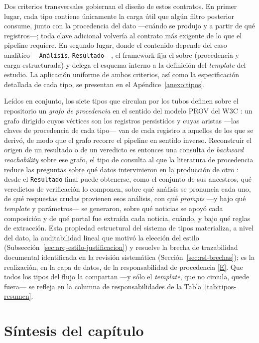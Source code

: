 \documentclass[12pt]{report}
\DeclareRobustCommand{\resp}[1]{\hyperref[tab:registro-responsabilidades]{\textcolor{respcolor}{[#1]}}}
\begin{document}
Dos criterios transversales gobiernan el diseño de estos contratos. En primer lugar, cada tipo contiene únicamente la carga útil que algún filtro posterior consume, junto con la procedencia del dato ---cuándo se produjo y a partir de qué registros---; toda clave adicional volvería al contrato más exigente de lo que el pipeline requiere. En segundo lugar, donde el contenido depende del caso analítico ---\texttt{Análisis}, \texttt{Resultado}---, el framework fija el sobre (procedencia y carga estructurada) y delega el esquema interno a la definición del \textit{template} del estudio. La aplicación uniforme de ambos criterios, así como la especificación detallada de cada tipo, se presentan en el Apéndice~\ref{anexo:tipos}.

Leídos en conjunto, los siete tipos que circulan por los tubos definen sobre el repositorio un \textit{grafo de procedencia} en el sentido del modelo PROV del W3C \citep{provdm:2013}: un grafo dirigido cuyos vértices son los registros persistidos y cuyas aristas ---las claves de procedencia de cada tipo--- van de cada registro a aquellos de los que se derivó, de modo que el grafo recorre el pipeline en sentido inverso. Reconstruir el origen de un resultado o de un veredicto es entonces una consulta de \textit{backward reachability} sobre ese grafo, el tipo de consulta al que la literatura de procedencia reduce las preguntas sobre qué datos intervinieron en la producción de otro \citep{cuevasvicenttin:2012}: desde el \texttt{Resultado} final puede obtenerse, como el conjunto de sus ancestros, qué veredictos de verificación lo componen, sobre qué análisis se pronuncia cada uno, de qué respuestas crudas provienen esos análisis, con qué \textit{prompts} ---y bajo qué \textit{template} y parámetros--- se generaron, sobre qué noticias se apoyó cada composición y de qué portal fue extraída cada noticia, cuándo, y bajo qué reglas de extracción. Esta propiedad estructural del sistema de tipos materializa, a nivel del dato, la auditabilidad lineal que motivó la elección del estilo (Subsección~\ref{sec:arq-estilo-justificacion}) y resuelve la brecha de trazabilidad documental identificada en la revisión sistemática (Sección~\ref{sec:rsl-brechas}); es la realización, en la capa de datos, de la responsabilidad de procedencia \resp{E}. Que todos los tipos del flujo la compartan ---y sólo el \textit{template}, que no circula, quede fuera--- se refleja en la columna de responsabilidades de la Tabla~\ref{tab:tipos-resumen}.

\section{Síntesis del capítulo}
\label{sec:arq-sintesis}
\end{document}
